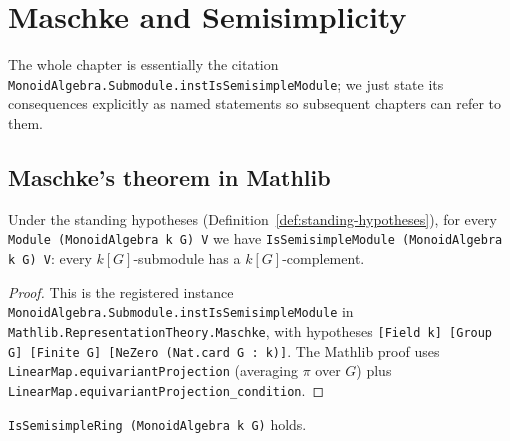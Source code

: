 \chapter{Maschke and Semisimplicity}
\label{chap:maschke}

The whole chapter is essentially the citation
\texttt{MonoidAlgebra.Submodule.instIsSemisimpleModule}; we just state its
consequences explicitly as named statements so subsequent chapters can refer
to them.

\section{Maschke's theorem in Mathlib}

\begin{theorem}
  \label{thm:maschke}
  \mathlibok
  \leanok
  Under the standing hypotheses (Definition~\ref{def:standing-hypotheses}),
  for every \texttt{Module (MonoidAlgebra k G) V} we have
  \texttt{IsSemisimpleModule (MonoidAlgebra k G) V}: every $k[G]$-submodule
  has a $k[G]$-complement.
\end{theorem}

\begin{proof}
  \leanok
  This is the registered instance
  \texttt{MonoidAlgebra.Submodule.instIsSemisimpleModule} in
  \texttt{Mathlib.RepresentationTheory.Maschke}, with hypotheses
  \texttt{[Field k] [Group G] [Finite G] [NeZero (Nat.card G : k)]}.
  The Mathlib proof uses
  \texttt{LinearMap.equivariantProjection} (averaging $\pi$ over $G$) plus
  \texttt{LinearMap.equivariantProjection\_condition}.
\end{proof}

\begin{corollary}
  \label{cor:kG-semisimple-ring}
  \leanok
  \texttt{IsSemisimpleRing (MonoidAlgebra k G)} holds.
\end{corollary}

